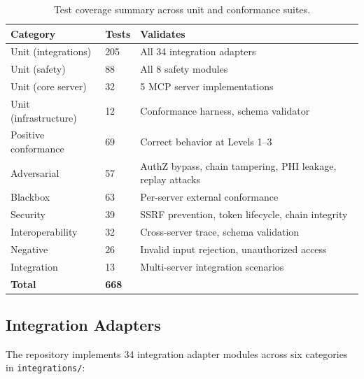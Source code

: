 \begin{table}[H]
\centering
\caption{Test coverage summary across unit and conformance suites.}
\label{tab:test-coverage}
\small
\begin{tabularx}{\textwidth}{@{}L{3cm}R{1.5cm}L{7cm}@{}}
\toprule
\textbf{Category} & \textbf{Tests} & \textbf{Validates} \\
\midrule
Unit (integrations) & 205 & All 34 integration adapters \\
Unit (safety) & 88 & All 8 safety modules \\
Unit (core server) & 32 & 5 MCP server implementations \\
Unit (infrastructure) & 12 & Conformance harness, schema validator \\
Positive conformance & 69 & Correct behavior at Levels 1--3 \\
Adversarial & 57 & AuthZ bypass, chain tampering, PHI leakage, replay attacks \\
Blackbox & 63 & Per-server external conformance \\
Security & 39 & SSRF prevention, token lifecycle, chain integrity \\
Interoperability & 32 & Cross-server trace, schema validation \\
Negative & 26 & Invalid input rejection, unauthorized access \\
Integration & 13 & Multi-server integration scenarios \\
\midrule
\textbf{Total} & \textbf{668} & \\
\bottomrule
\end{tabularx}
\end{table}

\subsection{Integration Adapters}

The repository implements 34 integration adapter modules across six categories in \texttt{integrations/}:

